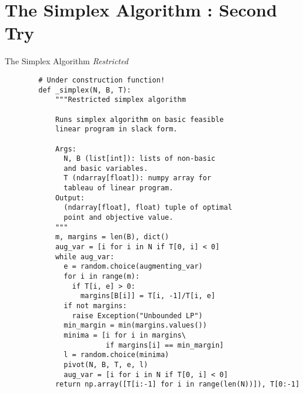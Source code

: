 \documentclass[aspectratio = 169]{beamer}
\begin{document}
\section{The Simplex Algorithm : Second Try}

\begin{frame}[fragile]{The Simplex Algorithm \emph{Restricted}}
  \begin{overlayarea}{1.1\textwidth}{.75\textheight}
  \setlength{\columnsep}{-10pt}
  \begin{multicols}{2}
    \scriptsize{
      \begin{verbatim}
        # Under construction function!
        def _simplex(N, B, T):
            """Restricted simplex algorithm

            Runs simplex algorithm on basic feasible
            linear program in slack form.

            Args:
              N, B (list[int]): lists of non-basic
              and basic variables.
              T (ndarray[float]): numpy array for
              tableau of linear program.
            Output:
              (ndarray[float], float) tuple of optimal
              point and objective value.
            """
            m, margins = len(B), dict()
            aug_var = [i for i in N if T[0, i] < 0]
            while aug_var:
              e = random.choice(augmenting_var)
              for i in range(m):
                if T[i, e] > 0:
                  margins[B[i]] = T[i, -1]/T[i, e]
              if not margins:
                raise Exception("Unbounded LP")
              min_margin = min(margins.values())
              minima = [i for i in margins\
                        if margins[i] == min_margin]
              l = random.choice(minima)
              pivot(N, B, T, e, l)
              aug_var = [i for i in N if T[0, i] < 0]
            return np.array([T[i:-1] for i in range(len(N))]), T[0:-1]
      \end{verbatim}
    }
  \end{multicols}
  \end{overlayarea}
\end{frame}
\end{document}
